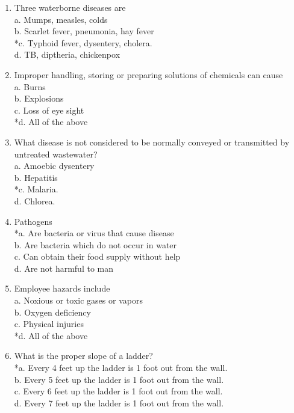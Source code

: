 \begin{enumerate}
\item Three waterborne diseases are \\

a. Mumps, measles, colds \\
b. Scarlet fever, pneumonia, hay fever \\
*c. Typhoid fever, dysentery, cholera. \\
d. TB, diptheria, chickenpox \\

\item Improper handling, storing or preparing solutions of chemicals can cause \\

a. Burns \\
b. Explosions \\
c. Loss of eye sight \\
*d. All of the above \\

\item What disease is not considered to be normally conveyed or transmitted by untreated wastewater? \\

a. Amoebic dysentery \\
b. Hepatitis \\
*c. Malaria. \\
d. Chlorea. \\

\item Pathogens \\

*a. Are bacteria or virus that cause disease \\
b. Are bacteria which do not occur in water \\
c. Can obtain their food supply without help \\
d. Are not harmful to man \\

\item Employee hazards include \\

a. Noxious or toxic gases or vapors \\
b. Oxygen deficiency \\
c. Physical injuries \\
*d. All of the above \\

\item What is the proper slope of a ladder?\\
*a. Every 4 feet up the ladder is 1 foot out from the wall.\\
b.  Every 5 feet up the ladder is 1 foot out from the wall.\\
c.  Every 6 feet up the ladder is 1 foot out from the wall.\\
d.  Every 7 feet up the ladder is 1 foot out from the wall.



\end{enumerate}

